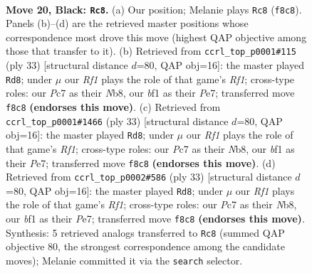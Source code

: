 \documentclass[11pt]{article}
\begin{document}
\clearpage

\begin{figure}[p]\centering
\begin{subfigure}{0.46\textwidth}\centering
\resizebox{\linewidth}{!}{%
\newchessgame
\chessboard[
  setfen={rn3r2/1pp1bpkP/p7/P3P1p1/2p1P1b1/2N5/1P1N4/R3KB1R b KQ - 0 20},
  showmover=false,
  pgfstyle=straightmove, color=movearrow, markmove={f8-c8}
]}
\caption{}
\end{subfigure}\hfill
\begin{subfigure}{0.46\textwidth}\centering
\resizebox{\linewidth}{!}{%
\newchessgame
\chessboard[
  setfen={rn3rk1/1p2pp1p/5bp1/1B1P1b2/3N4/pRN1P3/P4PPP/4K2R b K - 4 17},
  showmover=false,
  pgfstyle=straightmove, color=movearrow, markmove={f8-d8}
]}
\caption{}
\end{subfigure}
\\[4pt]
\begin{subfigure}{0.46\textwidth}\centering
\resizebox{\linewidth}{!}{%
\newchessgame
\chessboard[
  setfen={rn3rk1/1p2pp1p/5bp1/1B1P1b2/3N4/pRN1P3/P4PPP/4K2R b K - 4 17},
  showmover=false,
  pgfstyle=straightmove, color=movearrow, markmove={f8-d8}
]}
\caption{}
\end{subfigure}\hfill
\begin{subfigure}{0.46\textwidth}\centering
\resizebox{\linewidth}{!}{%
\newchessgame
\chessboard[
  setfen={rn3rk1/1p2pp1p/5bp1/1B1P1b2/3N4/pRN1P3/P4PPP/4K2R b K - 4 17},
  showmover=false,
  pgfstyle=straightmove, color=movearrow, markmove={f8-d8}
]}
\caption{}
\end{subfigure}
\caption{\textbf{Move 20, Black: \texttt{Rc8}.} (a) Our position; Melanie plays \texttt{Rc8} (\texttt{f8c8}). Panels (b)--(d) are the retrieved master positions whose correspondence most drove this move (highest QAP objective among those that transfer to it). (b) Retrieved from \texttt{ccrl\_top\_p0001\#115} (ply 33) [structural distance $d$=80, QAP obj=16]: the master played \texttt{Rd8}; under $\mu$ our \emph{Rf1} plays the role of that game's \emph{Rf1}; cross-type roles: our \emph{P}c7 as their \emph{N}b8, our \emph{b}f1 as their \emph{P}e7; transferred move \texttt{f8c8} \textbf{(endorses this move)}. (c) Retrieved from \texttt{ccrl\_top\_p0001\#1466} (ply 33) [structural distance $d$=80, QAP obj=16]: the master played \texttt{Rd8}; under $\mu$ our \emph{Rf1} plays the role of that game's \emph{Rf1}; cross-type roles: our \emph{P}c7 as their \emph{N}b8, our \emph{b}f1 as their \emph{P}e7; transferred move \texttt{f8c8} \textbf{(endorses this move)}. (d) Retrieved from \texttt{ccrl\_top\_p0002\#586} (ply 33) [structural distance $d$=80, QAP obj=16]: the master played \texttt{Rd8}; under $\mu$ our \emph{Rf1} plays the role of that game's \emph{Rf1}; cross-type roles: our \emph{P}c7 as their \emph{N}b8, our \emph{b}f1 as their \emph{P}e7; transferred move \texttt{f8c8} \textbf{(endorses this move)}. Synthesis: 5 retrieved analogs transferred to \texttt{Rc8} (summed QAP objective 80, the strongest correspondence among the candidate moves); Melanie committed it via the \texttt{search} selector.}
\label{fig:thought-m39}
\end{figure}
\end{document}
